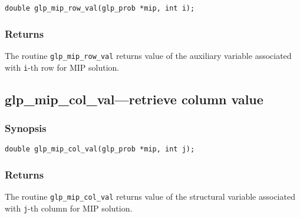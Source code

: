 \begin{verbatim}
double glp_mip_row_val(glp_prob *mip, int i);
\end{verbatim}

\subsubsection*{Returns}

The routine \verb|glp_mip_row_val| returns value of the auxiliary
variable associated with \verb|i|-th row for MIP solution.

\subsection{glp\_mip\_col\_val---retrieve column value}

\subsubsection*{Synopsis}

\begin{verbatim}
double glp_mip_col_val(glp_prob *mip, int j);
\end{verbatim}

\subsubsection*{Returns}

The routine \verb|glp_mip_col_val| returns value of the structural
variable associated with \verb|j|-th column for MIP solution.

